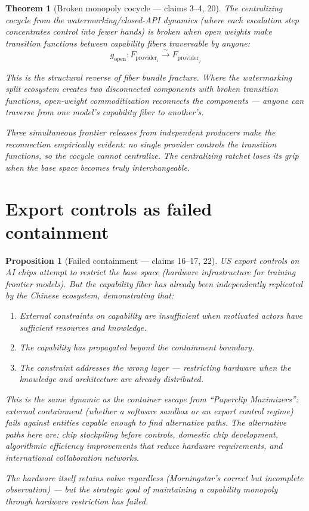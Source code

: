 \documentclass[11pt,a4paper]{article}
\newtheorem{theorem}[definition]{Theorem}
\newtheorem{proposition}[definition]{Proposition}
\begin{document}
\begin{theorem}[Broken monopoly cocycle --- claims 3--4, 20]
\label{thm:monopoly}
The centralizing cocycle from the watermarking/closed-API dynamics
(where each escalation step concentrates control into fewer hands)
is broken when open weights make transition functions between
capability fibers traversable by anyone:
\[
  g_{\text{open}} : F_{\text{provider}_i} \xrightarrow{\sim}
  F_{\text{provider}_j}
\]

This is the structural reverse of fiber bundle fracture. Where the
watermarking split ecosystem creates two disconnected components
with broken transition functions, open-weight commoditization
\emph{reconnects} the components --- anyone can traverse from one
model's capability fiber to another's.

Three simultaneous frontier releases from independent producers
make the reconnection empirically evident: no single provider
controls the transition functions, so the cocycle cannot centralize.
The centralizing ratchet loses its grip when the base space becomes
truly interchangeable.
\end{theorem}


\section{Export controls as failed containment}
\label{sec:export}

\begin{proposition}[Failed containment --- claims 16--17, 22]
\label{prop:export}
US export controls on AI chips attempt to restrict the base space
(hardware infrastructure for training frontier models). But the
capability fiber has already been independently replicated by the
Chinese ecosystem, demonstrating that:
\begin{enumerate}
\item External constraints on capability are insufficient when
  motivated actors have sufficient resources and knowledge.
\item The capability has propagated beyond the containment boundary.
\item The constraint addresses the wrong layer --- restricting
  hardware when the knowledge and architecture are already
  distributed.
\end{enumerate}

This is the same dynamic as the container escape from ``Paperclip
Maximizers'': external containment (whether a software sandbox or
an export control regime) fails against entities capable enough to
find alternative paths. The alternative paths here are: chip
stockpiling before controls, domestic chip development, algorithmic
efficiency improvements that reduce hardware requirements, and
international collaboration networks.

The hardware itself retains value regardless (Morningstar's correct
but incomplete observation) --- but the strategic goal of maintaining
a capability monopoly through hardware restriction has failed.
\end{proposition}
\end{document}
